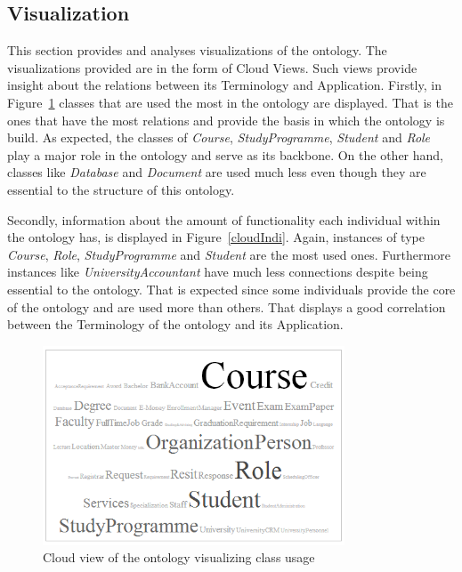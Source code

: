 \documentclass{article}    %
\begin{document}
\subsection{Visualization}
%
This section provides and analyses visualizations of the ontology. The visualizations provided are in the form of Cloud Views. Such views provide insight about the relations between its Terminology and Application. Firstly, in Figure~\ref{classUsage} classes that are used the most in the ontology are displayed. That is the ones that have the most relations and provide the basis in which the ontology is build. As expected, the classes of \textit{Course}, \textit{StudyProgramme}, \textit{Student} and \textit{Role} play a major role in the ontology and serve as its backbone. On the other hand, classes like \textit{Database} and \textit{Document} are used much less even though they are essential to the structure of this ontology.

Secondly, information about the amount of functionality each individual within the ontology has, is displayed in Figure~\ref{cloudIndi}. Again, instances of type \textit{Course}, \textit{Role}, \textit{StudyProgramme} and \textit{Student} are the most used ones. Furthermore instances like \textit{UniversityAccountant} have much less connections despite being essential to the ontology. That is expected since some individuals provide the core of the ontology and are used more than others. That displays a good correlation between the Terminology of the ontology and its Application.
\begin{figure}[htbp]
  \centering
    \includegraphics[width=0.8\textwidth]{Materials/Figures/classUsageCloud.png}
    \caption{Cloud view of the ontology visualizing class usage}
  \label{classUsage}
\end{figure}
\end{document}
